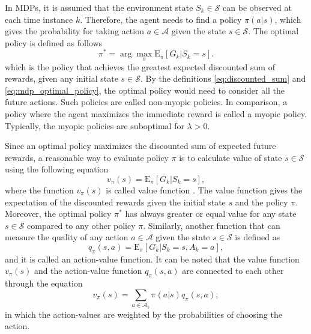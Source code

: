 \documentclass[english, 12pt, a4paper, elec, utf8, a-1b, online]{aaltothesis}
\numberwithin{equation}{section}
\newcommand{\Epolicy}[1]{\mathrm{E}_\pi \left[ #1 \right]}
\newcommand{\Ss}{\mathcal{S}}
\newcommand{\As}{\mathcal{A}}
\begin{document}
In MDPs, it is assumed that the environment state $S_k \in \Ss$ can be observed at each time instance $k$.
Therefore, the agent needs to find a policy $\pi(a | s)$, which gives the probability for taking action $a \in \As$ given the state $s \in \Ss$.
The optimal policy is defined as follows
\begin{equation}\label{eq:mdp_optimal_policy}
    \pi^* = \arg\max_\pi\Epolicy{G_k | S_k=s}.
\end{equation}
which is the policy that achieves the greatest expected discounted sum of rewards, given any initial state $s \in \Ss$.
By the definitions \eqref{eq:discounted_sum} and \eqref{eq:mdp_optimal_policy}, the optimal policy would need to consider all the future actions.
Such policies are called non-myopic policies.
In comparison, a policy where the agent maximizes the immediate reward is called a myopic policy. 
Typically, the myopic policies are suboptimal for $\lambda>0$.

Since an optimal policy maximizes the discounted sum of expected future rewards, a reasonable way to evaluate policy $\pi$ is to calculate value of state $s \in \Ss$ using the following equation
\begin{equation} \label{eq:value}
    v_\pi(s) = \Epolicy{G_k | S_k=s},
\end{equation}
where the function $v_\pi(s)$ is called value function \cite{Sutton2018}.
The value function gives the expectation of the discounted rewards given the initial state $s$ and the policy $\pi$.
Moreover, the optimal policy $\pi^*$ has always greater or equal value for any state $s \in \Ss$ compared to any other policy $\pi$.
Similarly, another function that can measure the quality of any action $a \in \As$ given the state $s \in \Ss$ is defined as
\begin{equation}\label{eq:action_value}
    q_\pi(s, a) = \Epolicy{G_k | S_k=s, A_k=a},
\end{equation}
and it is called an action-value function.
It can be noted that the value function $v_\pi(s)$ and the action-value function $ q_\pi(s, a)$ are connected to each other through the equation  
\begin{equation}\label{eq:value_action_value}
 v_\pi(s) =  \sum_{a\in \As_s} \pi(a | s) q_\pi(s, a),
\end{equation}
in which the action-values are weighted by the probabilities of choosing the action.
\end{document}

